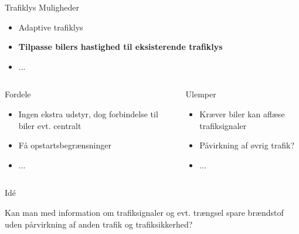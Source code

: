 \begin{frame}{Trafiklys}
Muligheder
\begin{itemize}
\item Adaptive trafiklys
\item \textbf{Tilpasse bilers hastighed til eksisterende trafiklys}
\item ...
\end{itemize}


\begin{center}
\begin{columns}
\begin{column}{0.5\textwidth}
Fordele
\begin{itemize}
\item Ingen ekstra udstyr, dog forbindelse til biler evt. centralt
\item Få opstartsbegrænsninger %
\item ...
\end{itemize}
\end{column}

\begin{column}{0.5\textwidth}
Ulemper
\begin{itemize}
\item Kræver biler kan aflæse trafiksignaler
\item Påvirkning af øvrig trafik?
\item ...
\end{itemize}
\end{column}
\end{columns}
\end{center}
\end{frame}

\begin{frame}{Idé}
\begin{center}
Kan man med information om trafiksignaler og evt. trængsel spare brændstof uden pårvirkning af anden trafik og trafiksikkerhed?
\end{center}
\end{frame}



